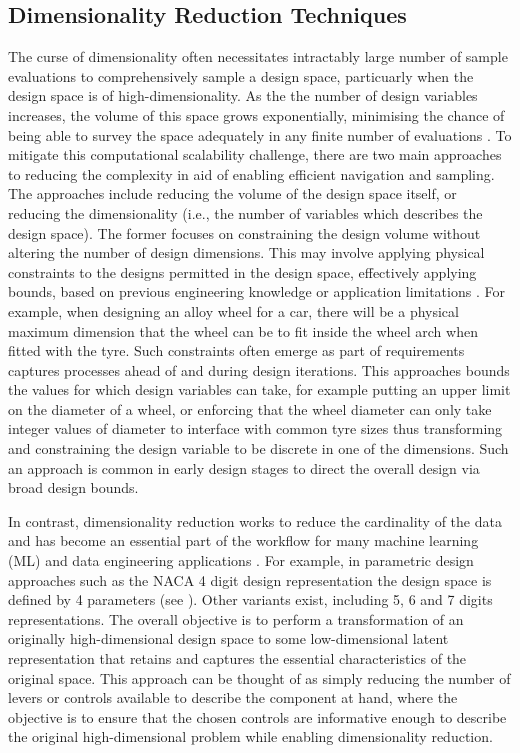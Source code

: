 \documentclass{article}
\begin{document}
\subsection{Dimensionality Reduction Techniques}
The curse of dimensionality often necessitates intractably large number of sample evaluations to comprehensively sample a design space, particuarly when the design space is of high-dimensionality. As the the number of design variables increases, the volume of this space grows exponentially, minimising the chance of being able to survey the space adequately in any finite number of evaluations \citep{Serani2024}. To mitigate this computational scalability challenge, there are two main approaches to reducing the complexity in aid of enabling efficient navigation and sampling. The approaches include reducing the volume of the design space itself, or reducing the dimensionality (i.e., the number of variables which describes the design space). The former focuses on constraining the design volume without altering the number of design dimensions. This may involve applying physical constraints to the designs permitted in the design space, effectively applying bounds, based on previous engineering knowledge or application limitations \citep{Serani2024}. For example, when designing an alloy wheel for a car, there will be a physical maximum dimension that the wheel can be to fit inside the wheel arch when fitted with the tyre. Such constraints often emerge as part of requirements captures processes ahead of and during design iterations. This approaches bounds the values for which design variables can take, for example putting an upper limit on the diameter of a wheel, or enforcing that the wheel diameter can only take integer values of diameter to interface with common tyre sizes thus transforming and constraining the design variable to be discrete in one of the dimensions. Such an approach is common in early design stages to direct the overall design via broad design bounds.

In contrast, dimensionality reduction works to reduce the cardinality of the data and has become an essential part of the workflow for many machine learning (ML) and data engineering applications \citep{Mendez2022}. For example, in parametric design approaches such as the NACA 4 digit design representation the design space is defined by 4 parameters (see \cite{Jacobs1933}). Other variants exist, including 5, 6 and 7 digits representations. The overall objective is to perform a transformation of an originally high-dimensional design space to some low-dimensional latent representation that retains and captures the essential characteristics of the original space. This approach can be thought of as simply reducing the number of levers or controls available to describe the component at hand, where the objective is to ensure that the chosen controls are informative enough to describe the original high-dimensional problem while enabling dimensionality reduction.
\end{document}
